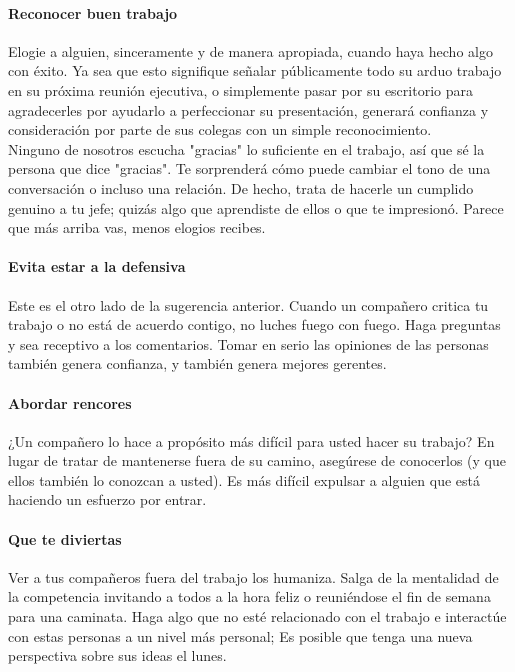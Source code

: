 \documentclass[10pt]{book}
\begin{document}
\paragraph{Reconocer buen trabajo}
Elogie a alguien, sinceramente y de manera apropiada, cuando haya hecho algo con éxito. Ya sea que esto signifique señalar públicamente todo su arduo trabajo en su próxima reunión ejecutiva, o simplemente pasar por su escritorio para agradecerles por ayudarlo a perfeccionar su presentación, generará confianza y consideración por parte de sus colegas con un simple reconocimiento.\\
Ninguno de nosotros escucha "gracias" lo suficiente en el trabajo, así que sé la persona que dice "gracias". Te sorprenderá cómo puede cambiar el tono de una conversación o incluso una relación. De hecho, trata de hacerle un cumplido genuino a tu jefe; quizás algo que aprendiste de ellos o que te impresionó. Parece que más arriba vas, menos elogios recibes.
\paragraph{Evita estar a la defensiva}
Este es el otro lado de la sugerencia anterior. Cuando un compañero critica tu trabajo o no está de acuerdo contigo, no luches fuego con fuego. Haga preguntas y sea receptivo a los comentarios. Tomar en serio las opiniones de las personas también genera confianza, y también genera mejores gerentes.
\paragraph{Abordar rencores}
¿Un compañero lo hace a propósito más difícil para usted hacer su trabajo? En lugar de tratar de mantenerse fuera de su camino, asegúrese de conocerlos (y que ellos también lo conozcan a usted). Es más difícil expulsar a alguien que está haciendo un esfuerzo por entrar.
\paragraph{Que te diviertas}
Ver a tus compañeros fuera del trabajo los humaniza. Salga de la mentalidad de la competencia invitando a todos a la hora feliz o reuniéndose el fin de semana para una caminata. Haga algo que no esté relacionado con el trabajo e interactúe con estas personas a un nivel más personal; Es posible que tenga una nueva perspectiva sobre sus ideas el lunes.
\end{document}
